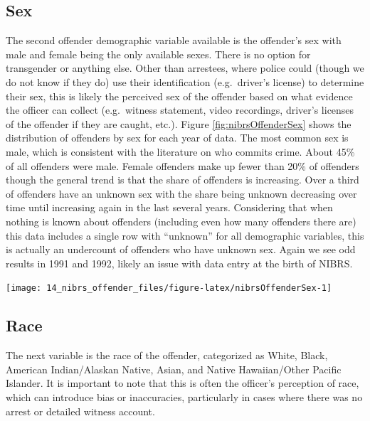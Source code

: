 \documentclass[
]{krantz}
\let\origfigure\figure
\let\endorigfigure\endfigure
\renewenvironment{figure}[1][2] {
    \expandafter\origfigure\expandafter[H]
} {
    \endorigfigure
}
\begin{document}
\subsection{Sex}\label{sex-1}

The second offender demographic variable available is the
offender's sex with male and female being the only available
sexes. There is no option for transgender or anything else.
Other than arrestees, where police could (though we do not
know if they do) use their identification (e.g.~driver's
license) to determine their sex, this is likely the
perceived sex of the offender based on what evidence the
officer can collect (e.g.~witness statement, video
recordings, driver's licenses of the offender if they are
caught, etc.). Figure \ref{fig:nibrsOffenderSex} shows the
distribution of offenders by sex for each year of data. The
most common sex is male, which is consistent with the
literature on who commits crime. About 45\% of all offenders
were male. Female offenders make up fewer than 20\% of
offenders though the general trend is that the share of
offenders is increasing. Over a third of offenders have an
unknown sex with the share being unknown decreasing over
time until increasing again in the last several years.
Considering that when nothing is known about offenders
(including even how many offenders there are) this data
includes a single row with ``unknown'' for all demographic
variables, this is actually an undercount of offenders who
have unknown sex. Again we see odd results in 1991 and 1992,
likely an issue with data entry at the birth of NIBRS.

\begin{figure}

{\centering \texttt{[image: 14\_nibrs\_offender\_files/figure-latex/nibrsOffenderSex-1]} 

}

\caption{The share of offenders by sex, 1991-2023.}\label{fig:nibrsOffenderSex}
\end{figure}

\subsection{Race}\label{race-2}

The next variable is the race of the offender, categorized
as White, Black, American Indian/Alaskan Native, Asian, and
Native Hawaiian/Other Pacific Islander. It is important to
note that this is often the officer's perception of race,
which can introduce bias or inaccuracies, particularly in
cases where there was no arrest or detailed witness account.
\end{document}
